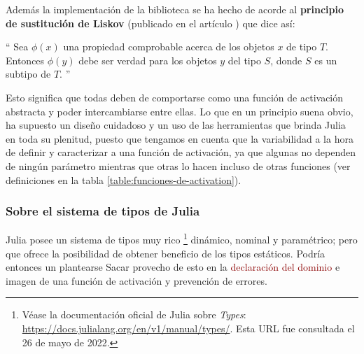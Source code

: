 Además la implementación de la biblioteca se ha hecho de acorde 
al \textbf{principio de sustitución de Liskov} (publicado en el artículo \cite{Liskov-principle}) que dice así: 

\enquote{
    Sea $\phi(x)$ una propiedad comprobable acerca de los objetos $x$ de tipo $T$. 
    Entonces $\phi(y)$  debe ser verdad para los objetos $y$ del tipo $S$, donde $S$ es un 
    subtipo de $T$. 
}

Esto significa que todas deben de comportarse
como una función de activación abstracta y poder intercambiarse entre ellas. 
Lo que en un principio suena obvio, ha supuesto un diseño cuidadoso y un uso de las herramientas que brinda Julia en toda 
su plenitud, puesto que tengamos en cuenta que la variabilidad a la hora de definir y caracterizar a una función de activación, ya que algunas no dependen de ningún parámetro 
mientras que otras lo hacen incluso de otras funciones (ver definiciones en la tabla \ref{table:funciones-de-activation}). 

 
\subsubsection*{Sobre el sistema de tipos de Julia}
\label{ch06:sistema-timpos-julia}
    Julia posee un sistema de tipos muy rico 
    \footnote{
        Véase la documentación oficial de Julia sobre \textit{Types}: 
        \url{https://docs.julialang.org/en/v1/manual/types/}. 
        Esta URL fue consultada el 26 de mayo de 2022.
    }
    dinámico, nominal y paramétrico; pero que ofrece la posibilidad de obtener
    beneficio de los tipos estáticos.
    Podría entonces un plantearse 
    Sacar provecho de esto en la \textcolor{darkRed}{declaración 
    del dominio} e imagen de una función de activación y prevención de errores. 
 
    \reversemarginpar
    \setlength{\marginparwidth}{\smallMarginSize}
    \setlength{\marginparwidth}{\bigMarginSize}
    \normalmarginpar 
   
